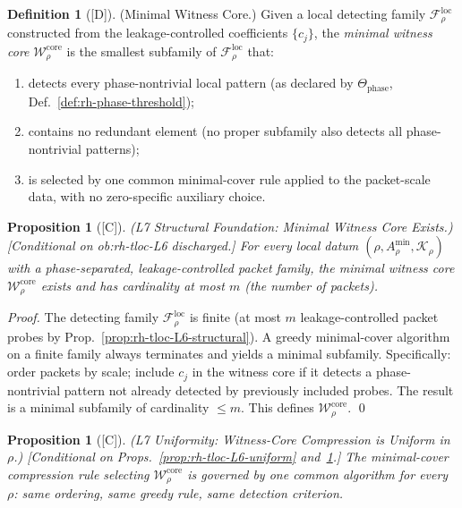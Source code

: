\documentclass[12pt,oneside]{amsbook}
\theoremstyle{plain}
\newtheorem{proposition}[theorem]{Proposition}
\theoremstyle{definition}
\newtheorem{definition}[theorem]{Definition}
\theoremstyle{remark}
\newcommand{\status}[1]{\textup{[#1]}}
\begin{document}
\begin{definition}[\status{D}]\label{def:rh-witness-core}
\textup{(Minimal Witness Core.)}
Given a local detecting family $\mathcal{F}_\rho^{\mathrm{loc}}$
constructed from the leakage-controlled coefficients $\{c_j\}$, the
\emph{minimal witness core} $\mathcal{W}_\rho^{\mathrm{core}}$ is the
smallest subfamily of $\mathcal{F}_\rho^{\mathrm{loc}}$ that:
\begin{enumerate}[label=\textup{(\arabic*)}]
 \item detects every phase-nontrivial local pattern
 (as declared by $\Theta_{\mathrm{phase}}$,
 Def.~\ref{def:rh-phase-threshold});
 \item contains no redundant element (no proper subfamily also
 detects all phase-nontrivial patterns);
 \item is selected by one common minimal-cover rule applied to
 the packet-scale data, with no zero-specific auxiliary choice.
\end{enumerate}
\end{definition}

\begin{proposition}[\status{C}]\label{prop:rh-tloc-L7-structural}
\textup{(L7 Structural Foundation: Minimal Witness Core Exists.)}
\textup{[Conditional on ob:rh-tloc-L6 discharged.]}
For every local datum $(\rho, A_\rho^{\min}, \mathcal{K}_\rho)$ with
a phase-separated, leakage-controlled packet family, the minimal
witness core $\mathcal{W}_\rho^{\mathrm{core}}$ exists and has
cardinality at most $m$ (the number of packets).
\end{proposition}

\begin{proof}
The detecting family $\mathcal{F}_\rho^{\mathrm{loc}}$ is finite
(at most $m$ leakage-controlled packet probes by
Prop.~\ref{prop:rh-tloc-L6-structural}). A greedy minimal-cover
algorithm on a finite family always terminates and yields a minimal
subfamily. Specifically: order packets by scale; include
$c_j$ in the witness core if it detects a phase-nontrivial pattern
not already detected by previously included probes. The result
is a minimal subfamily of cardinality $\leq m$. This defines
$\mathcal{W}_\rho^{\mathrm{core}}$. \qed
\end{proof}

\begin{proposition}[\status{C}]\label{prop:rh-tloc-L7-uniform}
\textup{(L7 Uniformity: Witness-Core Compression is Uniform in $\rho$.)}
\textup{[Conditional on Props.~\ref{prop:rh-tloc-L6-uniform}
and~\ref{prop:rh-tloc-L7-structural}.]}
The minimal-cover compression rule selecting
$\mathcal{W}_\rho^{\mathrm{core}}$ is governed by one common
algorithm for every $\rho$: same ordering, same greedy rule, same
detection criterion.
\end{proposition}
\end{document}
